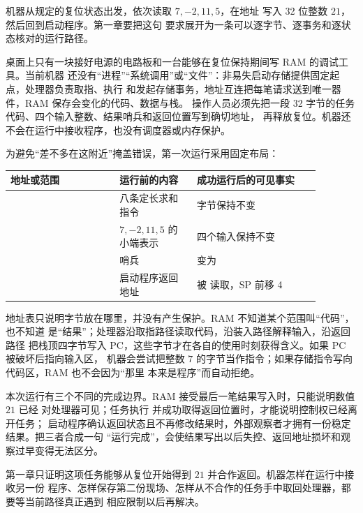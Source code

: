 \begin{keyidea}
机器从规定的复位状态出发，依次读取 \(7,-2,11,5\)，在地址
 写入 32 位整数 \(21\)，然后回到启动程序。第一章要把这句
要求展开为一条可以逐字节、逐事务和逐状态核对的运行路径。
\end{keyidea}

桌面上只有一块接好电源的电路板和一台能够在复位保持期间写 RAM 的调试工具。当前机器
还没有“进程”“系统调用”或“文件”：非易失启动存储提供固定起点，处理器负责取指、执行
和发起存储事务，地址互连把每笔请求送到唯一器件，RAM 保存会变化的代码、数据与栈。
操作人员必须先把一段 32 字节的任务代码、四个输入整数、结果哨兵和返回位置写到确切地址，
再释放复位。机器还不会在运行中接收程序，也没有调度器或内存保护。

为避免“差不多在这附近”掩盖错误，第一次运行采用固定布局：

\begin{longtable}{|L{0.31\linewidth}|L{0.22\linewidth}|L{0.35\linewidth}|}
\hline
{}
地址或范围 & 运行前的内容 & 成功运行后的可见事实 \\ \hline
{} & 八条定长求和指令 & 字节保持不变 \\ \hline
{} & \(7,-2,11,5\) 的小端表示 & 四个输入保持不变 \\ \hline
{} & 哨兵  & 变为  \\ \hline
{} & 启动程序返回地址  & 被  读取，SP 前移 4 \\ \hline
\end{longtable}

地址表只说明字节放在哪里，并没有产生保护。RAM 不知道某个范围叫“代码”，也不知道
 是“结果”；处理器沿取指路径读取代码，沿装入路径解释输入，沿返回路径
把栈顶四字节写入 PC，这些字节才在各自的使用时刻获得含义。如果 PC 被破坏后指向输入区，
机器会尝试把整数 \(7\) 的字节当作指令；如果存储指令写向代码区，RAM 也不会因为“那里
本来是程序”而自动拒绝。

本次运行有三个不同的完成边界。RAM 接受最后一笔结果写入时，只能说明数值 \(21\) 已经
对处理器可见；任务执行  并成功取得返回位置时，才能说明控制权已经离开任务；
启动程序确认返回状态且不再修改结果时，外部观察者才拥有一份稳定结果。把三者合成一句
“运行完成”，会使结果写出以后失控、返回地址损坏和观察过早变得无法区分。

第一章只证明这项任务能够从复位开始得到 \(21\) 并合作返回。机器怎样在运行中接收另一份
程序、怎样保存第二份现场、怎样从不合作的任务手中取回处理器，都要等当前路径真正遇到
相应限制以后再解决。
